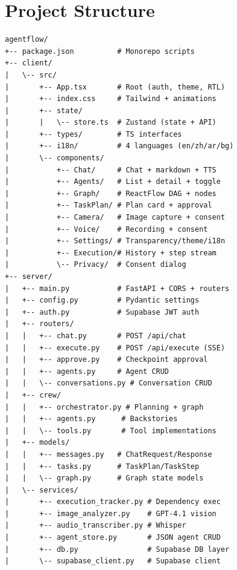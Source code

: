 \documentclass[sigconf, anonymous]{acmart}
\begin{document}
\begin{acks}
\end{acks}




\appendix

\section{Project Structure}
\label{app:structure}

{\small
\begin{verbatim}
agentflow/
+-- package.json          # Monorepo scripts
+-- client/
|   \-- src/
|       +-- App.tsx       # Root (auth, theme, RTL)
|       +-- index.css     # Tailwind + animations
|       +-- state/
|       |   \-- store.ts  # Zustand (state + API)
|       +-- types/        # TS interfaces
|       +-- i18n/         # 4 languages (en/zh/ar/bg)
|       \-- components/
|           +-- Chat/     # Chat + markdown + TTS
|           +-- Agents/   # List + detail + toggle
|           +-- Graph/    # ReactFlow DAG + nodes
|           +-- TaskPlan/ # Plan card + approval
|           +-- Camera/   # Image capture + consent
|           +-- Voice/    # Recording + consent
|           +-- Settings/ # Transparency/theme/i18n
|           +-- Execution/# History + step stream
|           \-- Privacy/  # Consent dialog
+-- server/
|   +-- main.py           # FastAPI + CORS + routers
|   +-- config.py         # Pydantic settings
|   +-- auth.py           # Supabase JWT auth
|   +-- routers/
|   |   +-- chat.py       # POST /api/chat
|   |   +-- execute.py    # POST /api/execute (SSE)
|   |   +-- approve.py    # Checkpoint approval
|   |   +-- agents.py     # Agent CRUD
|   |   \-- conversations.py # Conversation CRUD
|   +-- crew/
|   |   +-- orchestrator.py # Planning + graph
|   |   +-- agents.py      # Backstories
|   |   \-- tools.py       # Tool implementations
|   +-- models/
|   |   +-- messages.py   # ChatRequest/Response
|   |   +-- tasks.py      # TaskPlan/TaskStep
|   |   \-- graph.py      # Graph state models
|   \-- services/
|       +-- execution_tracker.py # Dependency exec
|       +-- image_analyzer.py    # GPT-4.1 vision
|       +-- audio_transcriber.py # Whisper
|       +-- agent_store.py       # JSON agent CRUD
|       +-- db.py                # Supabase DB layer
|       \-- supabase_client.py   # Supabase client
\end{verbatim}
}
\end{document}
